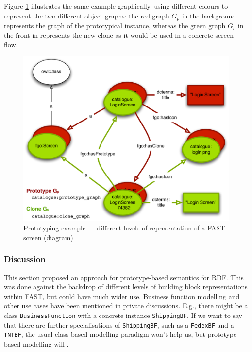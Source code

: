 \documentclass{article}
\begin{document}
\singlespacing
{}
\begin{figure}
	
\end{figure}
\doublespacing

Figure \ref{fig:prototype_example_graph} illustrates the same example graphically, using different colours to represent the two different object graphs: the red graph $G_p$ in the background represents the graph of the prototypical instance, whereas the green graph $G_c$ in the front in represents the new clone as it would be used in a concrete screen flow. 

\begin{figure}
  \begin{center}
    \includegraphics[width=.75\linewidth]{images/prototypeExample.pdf}
    \caption{Prototyping example --- different levels of representation of a FAST screen (diagram)}
    \label{fig:prototype_example_graph}
  \end{center}
\end{figure}




\subsubsection{Discussion} %
\label{ssub:discussion}

This section proposed an approach for prototype-based semantics for RDF. This was done against the backdrop of different levels of building block representations within FAST, but could have much wider use. Business function modelling and other use cases have been mentioned in private discussions. E.g., there might be a class \texttt{BusinessFunction} with a concrete instance \texttt{ShippingBF}. If we want to say that there are further specialisations of \texttt{ShippingBF}, such as a \texttt{FedexBF} and a \texttt{TNTBF}, the usual class-based modelling paradigm won't help us, but prototype-based modelling will \cite{bhiri2010businessFunctionModelling}.
\end{document}
